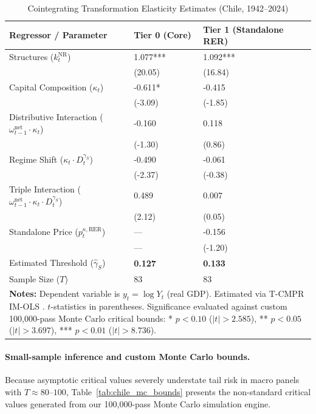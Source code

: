 \begin{table}[h!]
	\centering
	\caption{Cointegrating Transformation Elasticity Estimates (Chile, 1942--2024)}
	\label{tab:chile_imols_primary}
	\begin{tabular}{p{5.5cm} p{3.2cm} p{3.2cm}}
		\toprule
		\textbf{Regressor / Parameter} & \textbf{Tier 0 (Core)} & \textbf{Tier 1 (Standalone RER)} \\
		\midrule
		Structures ($k^{\text{NR}}_t$) & 1.077*** & 1.092*** \\
		& (20.05) & (16.84) \\
		Capital Composition ($\kappa_t$) & -0.611* & -0.415 \\
		& (-3.09) & (-1.85) \\
		Distributive Interaction ($\omega^{\text{net}}_{t-1} \cdot \kappa_t$) & -0.160 & 0.118 \\
		& (-1.30) & (0.86) \\
		Regime Shift ($\kappa_t \cdot D^{\gamma_S}_t$) & -0.490 & -0.061 \\
		& (-2.37) & (-0.38) \\
		Triple Interaction ($\omega^{\text{net}}_{t-1} \cdot \kappa_t \cdot D^{\gamma_S}_t$) & 0.489 & 0.007 \\
		& (2.12) & (0.05) \\
		Standalone Price ($p^{\kappa,\text{RER}}_t$) & --- & -0.156 \\
		& --- & (-1.20) \\
		\midrule
		Estimated Threshold ($\hat{\gamma}_S$) & \textbf{0.127} & \textbf{0.133} \\
		Sample Size ($T$) & 83 & 83 \\
		\bottomrule
		\multicolumn{3}{p{12.5cm}}{\footnotesize \textbf{Notes:} Dependent variable is $y_t = \log Y_t$ (real GDP). Estimated via T-CMPR IM-OLS \citep{VogelsangWagner2024}. $t$-statistics in parentheses. Significance evaluated against custom 100,000-pass Monte Carlo critical bounds: * $p < 0.10$ ($|t| > 2.585$), ** $p < 0.05$ ($|t| > 3.697$), *** $p < 0.01$ ($|t| > 8.736$).}
	\end{tabular}
\end{table}

\paragraph{Small-sample inference and custom Monte Carlo bounds.}
Because asymptotic critical values severely understate tail risk in macro panels with $T \approx 80$--$100$, Table~\ref{tab:chile_mc_bounds} presents the non-standard critical values generated from our 100,000-pass Monte Carlo simulation engine.

